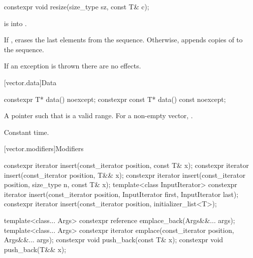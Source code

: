 %
\begin{itemdecl}
constexpr void resize(size_type sz, const T& c);
\end{itemdecl}

\begin{itemdescr}
\pnum
\expects
{} is
 into .

\pnum
\effects
If , erases the last  elements
from the sequence. Otherwise,
appends  copies of  to the sequence.

\pnum
\remarks
If an exception is thrown there are no effects.
\end{itemdescr}

[vector.data]{Data}

%
\begin{itemdecl}
constexpr T*         data() noexcept;
constexpr const T*   data() const noexcept;
\end{itemdecl}

\begin{itemdescr}
\pnum
\returns
A pointer such that  is a valid range. For a
non-empty vector,  \tcode{==} .

\pnum
\complexity
Constant time.
\end{itemdescr}

[vector.modifiers]{Modifiers}

%
\begin{itemdecl}
constexpr iterator insert(const_iterator position, const T& x);
constexpr iterator insert(const_iterator position, T&& x);
constexpr iterator insert(const_iterator position, size_type n, const T& x);
template<class InputIterator>
  constexpr iterator insert(const_iterator position, InputIterator first, InputIterator last);
constexpr iterator insert(const_iterator position, initializer_list<T>);

template<class... Args> constexpr reference emplace_back(Args&&... args);
template<class... Args> constexpr iterator emplace(const_iterator position, Args&&... args);
constexpr void push_back(const T& x);
constexpr void push_back(T&& x);
\end{itemdecl}

